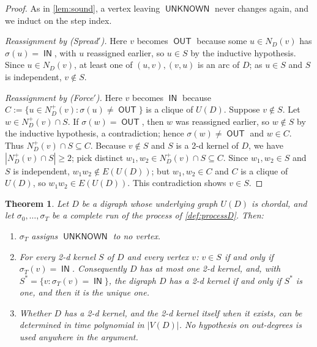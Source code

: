 \documentclass[11pt]{article}
\numberwithin{equation}{section}
\theoremstyle{plain}
\newtheorem{theorem}{Theorem}[section]
\newcommand{\V}{V}
\newcommand{\Np}{N^{+}}
\newcommand{\und}{U}                       %
\newcommand{\st}{\sigma}                   %
\DeclareMathOperator{\IN}{\mathsf{IN}}
\DeclareMathOperator{\OUT}{\mathsf{OUT}}
\DeclareMathOperator{\UNK}{\mathsf{UNKNOWN}}
\begin{document}
\begin{proof}
As in \cref{lem:sound}, a vertex leaving $\UNK$ never changes again, and we induct on
the step index.

\emph{Reassignment by (Spread$'$).} Here $v$ becomes $\OUT$ because some $u\in N_D(v)$
has $\st(u)=\IN$, with $u$ reassigned earlier, so $u\in S$ by the inductive hypothesis.
Since $u\in N_D(v)$, at least one of $(u,v),(v,u)$ is an arc of $D$; as $u\in S$ and $S$
is independent, $v\notin S$.

\emph{Reassignment by (Force$'$).} Here $v$ becomes $\IN$ because
$C:=\{u\in\Np_D(v):\st(u)\neq\OUT\}$ is a clique of $\und(D)$. Suppose $v\notin S$. Let
$w\in\Np_D(v)\cap S$. If $\st(w)=\OUT$, then $w$ was reassigned earlier, so $w\notin S$
by the inductive hypothesis, a contradiction; hence $\st(w)\neq\OUT$ and $w\in C$. Thus
$\Np_D(v)\cap S\subseteq C$. Because $v\notin S$ and $S$ is a 2-d kernel of $D$, we have
$|\Np_D(v)\cap S|\ge 2$; pick distinct $w_1,w_2\in\Np_D(v)\cap S\subseteq C$. Since
$w_1,w_2\in S$ and $S$ is independent, $w_1w_2\notin E(\und(D))$; but $w_1,w_2\in C$ and
$C$ is a clique of $\und(D)$, so $w_1w_2\in E(\und(D))$. This contradiction shows
$v\in S$.
\end{proof}

\begin{theorem}\label{thm:chordaldigraph}
Let $D$ be a digraph whose underlying graph $\und(D)$ is chordal, and let
$\st_0,\dots,\st_T$ be a complete run of the process of \cref{def:processD}. Then:
\begin{enumerate}[label=\textup{(\arabic*)},leftmargin=2.6em]
\item $\st_T$ assigns $\UNK$ to no vertex.
\item For every 2-d kernel $S$ of $D$ and every vertex $v$: $v\in S$ if and only if
$\st_T(v)=\IN$. Consequently $D$ has at most one 2-d kernel, and, with
$S^\ast=\{v:\st_T(v)=\IN\}$, the digraph $D$ has a 2-d kernel if and only if $S^\ast$ is
one, and then it is the unique one.
\item Whether $D$ has a 2-d kernel, and the 2-d kernel itself when it exists, can be
determined in time polynomial in $|\V(D)|$. No hypothesis on out-degrees is used
anywhere in the argument.
\end{enumerate}
\end{theorem}
\end{document}
